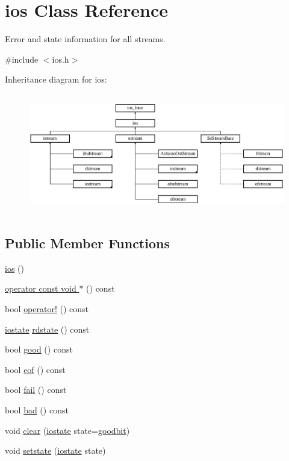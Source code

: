 \hypertarget{classios}{\section{ios Class Reference}
\label{classios}
}


Error and state information for all streams.  




{\ttfamily \#include $<$ios.\-h$>$}

Inheritance diagram for ios\-:\begin{figure}[H]
\begin{center}
\leavevmode
\includegraphics[height=5.268817cm]{classios}
\end{center}
\end{figure}
\subsection*{Public Member Functions}
\begin{DoxyCompactItemize}
\item 
\hyperlink{classios_a6329d50a06622c1d13c80acb5c53e570}{ios} ()
\item 
\hyperlink{classios_a3bb44e4caa93193070a6435f432edb3a}{operator const void $\ast$} () const 
\item 
bool \hyperlink{classios_ac8b1d32dbd52d431450c70b151cfa205}{operator!} () const 
\item 
\hyperlink{classios__base_a67209c853f091390e1a08ac0b043fe11}{iostate} \hyperlink{classios_a2b9823af3bc44a4fb960eaca1641cc54}{rdstate} () const 
\item 
bool \hyperlink{classios_ad2e41c8280b6cdf93d39e1135d2abdf7}{good} () const 
\item 
bool \hyperlink{classios_ac4bcdb9a2c4adf5c3d247a711a7142cc}{eof} () const 
\item 
bool \hyperlink{classios_a92f9d567f6026d4eedd836b51de0aed5}{fail} () const 
\item 
bool \hyperlink{classios_ae5145c481e0280c8b6b365e616058d36}{bad} () const 
\item 
void \hyperlink{classios_a1978eec476ebfeed466b5ce921853720}{clear} (\hyperlink{classios__base_a67209c853f091390e1a08ac0b043fe11}{iostate} state=\hyperlink{classios__base_ada0c8aa0797472d458523a3c2c475cdb}{goodbit})
\item 
void \hyperlink{classios_ae3c59834ea2d5cfd6945e77eac466b16}{setstate} (\hyperlink{classios__base_a67209c853f091390e1a08ac0b043fe11}{iostate} state)
\end{DoxyCompactItemize}
